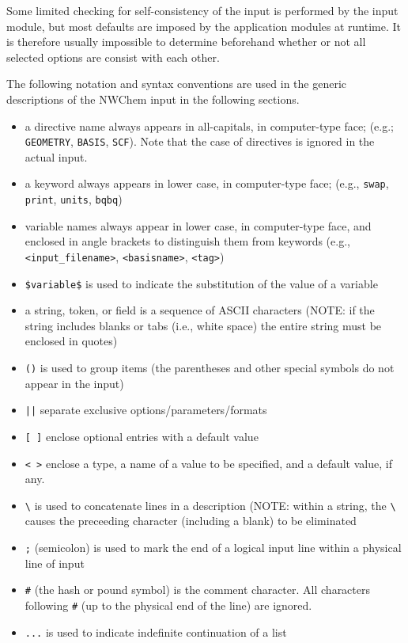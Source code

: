 Some limited checking for self-consistency of the input is performed
by the input module, but most defaults are imposed by the application
modules at runtime.  It is therefore usually impossible to determine
beforehand whether or not all selected options are consist with each
other.

The following notation and syntax conventions are used in the generic 
descriptions of the NWChem input in the following sections.

\begin{itemize}
\item a directive name always appears in all-capitals, in computer-type 
face; (e.g.; \verb+GEOMETRY+, \verb+BASIS+, \verb+SCF+).  Note that 
the case of directives is ignored in the actual input.
\item a keyword always appears in lower case, in computer-type face; (e.g.,
{\tt swap}, {\tt print}, {\tt units}, {\tt bqbq})
\item variable names always appear in lower case, in computer-type face, 
and enclosed in angle brackets to distinguish them from keywords (e.g.,
{\tt <input\_filename>}, {\tt <basisname>}, {\tt <tag>})
\item \verb+$variable$+ is used to indicate the substitution of the value of a
      variable
\item a string, token, or field is a sequence of ASCII characters (NOTE: if 
the string includes blanks or tabs (i.e., white space) the entire string must
be enclosed in quotes)
\item \verb+()+ is used to group items (the parentheses and other
      special symbols do not appear in the input)
\item \verb+||+ separate exclusive options/parameters/formats
\item \verb+[ ]+ enclose optional entries with a default value
\item \verb+< >+ enclose a type, a name of a value to be specified,
      and a default value, if any.

\item \verb+\+ is used to concatenate lines in a description (NOTE: within 
a string, the \verb+\+ causes the preceeding character (including a blank) 
to be eliminated
\item \verb+;+ (semicolon) is used to mark the end of a logical input 
line within a physical line of input
\item \verb+#+ (the hash or pound symbol) is the comment character.  All
characters following \verb+#+ (up to the physical end of the line) are ignored.

\item \verb+...+ is used to indicate indefinite continuation of a list
\end{itemize}

